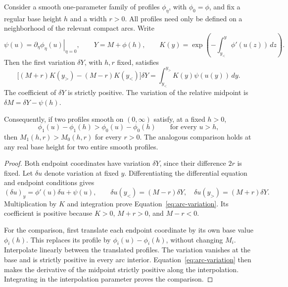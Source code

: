 \begin{lemma}\label{lem:variation}
Consider a smooth one-parameter family of profiles \(\phi_\eta\), with
\(\phi_0=\phi\), and fix a regular base height \(h\) and a width \(r>0\).
All profiles need only be defined on a neighborhood of the relevant
compact arcs. Write
\[
  \psi(u)=\left.\partial_\eta\phi_\eta(u)\right|_{\eta=0},
  \qquad Y=M+\phi(h),\qquad
  K(y)=\exp\left(-\int_{y_<}^{y}\phi'(u(z))\,dz\right).
\]
Then the first variation \(\delta Y\), with \(h,r\) fixed, satisfies
\begin{equation}\label{eq:arc-variation}
 \bigl[(M+r)K(y_>)-(M-r)K(y_<)\bigr]\delta Y
       =\int_{y_<}^{y_>}K(y)\psi(u(y))\,dy.
\end{equation}
The coefficient of \(\delta Y\) is strictly positive. The variation of
the relative midpoint is \(\delta M=\delta Y-\psi(h)\).

Consequently, if two profiles smooth on \((0,\infty)\) satisfy, at
a fixed \(h>0\),
\[
  \phi_1(u)-\phi_1(h)>\phi_0(u)-\phi_0(h)
  \qquad\text{for every }u>h,
\]
then \(M_1(h,r)>M_0(h,r)\) for every \(r>0\). The analogous
comparison holds at any real base height for two entire smooth
profiles.
\end{lemma}

\begin{proof}
Both endpoint coordinates have variation \(\delta Y\), since their
difference \(2r\) is fixed. Let \(\delta u\) denote variation at fixed
\(y\). Differentiating the differential equation and endpoint
conditions gives
\[
  (\delta u)_y=\phi'(u)\delta u+\psi(u),\qquad
  \delta u(y_<)=(M-r)\delta Y,\quad
  \delta u(y_>)=(M+r)\delta Y.
\]
Multiplication by \(K\) and integration prove
Equation~\eqref{eq:arc-variation}. Its coefficient is positive because
\(K>0\), \(M+r>0\), and \(M-r<0\).

For the comparison, first translate each endpoint coordinate by its
own base value \(\phi_i(h)\). This replaces its profile by
\(\phi_i(u)-\phi_i(h)\), without changing \(M_i\). Interpolate linearly
between the translated profiles. The variation vanishes at the base
and is strictly positive in every arc interior. Equation~\eqref{eq:arc-variation}
then makes the derivative of the midpoint strictly positive along
the interpolation. Integrating in the interpolation parameter proves
the comparison.
\end{proof}


